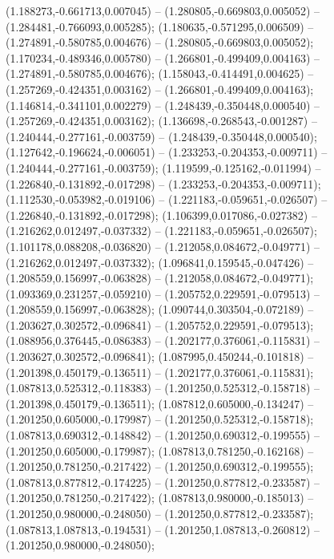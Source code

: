  (1.188273,-0.661713,0.007045) -- (1.280805,-0.669803,0.005052) -- (1.284481,-0.766093,0.005285);
 (1.180635,-0.571295,0.006509) -- (1.274891,-0.580785,0.004676) -- (1.280805,-0.669803,0.005052);
 (1.170234,-0.489346,0.005780) -- (1.266801,-0.499409,0.004163) -- (1.274891,-0.580785,0.004676);
 (1.158043,-0.414491,0.004625) -- (1.257269,-0.424351,0.003162) -- (1.266801,-0.499409,0.004163);
 (1.146814,-0.341101,0.002279) -- (1.248439,-0.350448,0.000540) -- (1.257269,-0.424351,0.003162);
 (1.136698,-0.268543,-0.001287) -- (1.240444,-0.277161,-0.003759) -- (1.248439,-0.350448,0.000540);
 (1.127642,-0.196624,-0.006051) -- (1.233253,-0.204353,-0.009711) -- (1.240444,-0.277161,-0.003759);
 (1.119599,-0.125162,-0.011994) -- (1.226840,-0.131892,-0.017298) -- (1.233253,-0.204353,-0.009711);
 (1.112530,-0.053982,-0.019106) -- (1.221183,-0.059651,-0.026507) -- (1.226840,-0.131892,-0.017298);
 (1.106399,0.017086,-0.027382) -- (1.216262,0.012497,-0.037332) -- (1.221183,-0.059651,-0.026507);
 (1.101178,0.088208,-0.036820) -- (1.212058,0.084672,-0.049771) -- (1.216262,0.012497,-0.037332);
 (1.096841,0.159545,-0.047426) -- (1.208559,0.156997,-0.063828) -- (1.212058,0.084672,-0.049771);
 (1.093369,0.231257,-0.059210) -- (1.205752,0.229591,-0.079513) -- (1.208559,0.156997,-0.063828);
 (1.090744,0.303504,-0.072189) -- (1.203627,0.302572,-0.096841) -- (1.205752,0.229591,-0.079513);
 (1.088956,0.376445,-0.086383) -- (1.202177,0.376061,-0.115831) -- (1.203627,0.302572,-0.096841);
 (1.087995,0.450244,-0.101818) -- (1.201398,0.450179,-0.136511) -- (1.202177,0.376061,-0.115831);
 (1.087813,0.525312,-0.118383) -- (1.201250,0.525312,-0.158718) -- (1.201398,0.450179,-0.136511);
 (1.087812,0.605000,-0.134247) -- (1.201250,0.605000,-0.179987) -- (1.201250,0.525312,-0.158718);
 (1.087813,0.690312,-0.148842) -- (1.201250,0.690312,-0.199555) -- (1.201250,0.605000,-0.179987);
 (1.087813,0.781250,-0.162168) -- (1.201250,0.781250,-0.217422) -- (1.201250,0.690312,-0.199555);
 (1.087813,0.877812,-0.174225) -- (1.201250,0.877812,-0.233587) -- (1.201250,0.781250,-0.217422);
 (1.087813,0.980000,-0.185013) -- (1.201250,0.980000,-0.248050) -- (1.201250,0.877812,-0.233587);
 (1.087813,1.087813,-0.194531) -- (1.201250,1.087813,-0.260812) -- (1.201250,0.980000,-0.248050);
